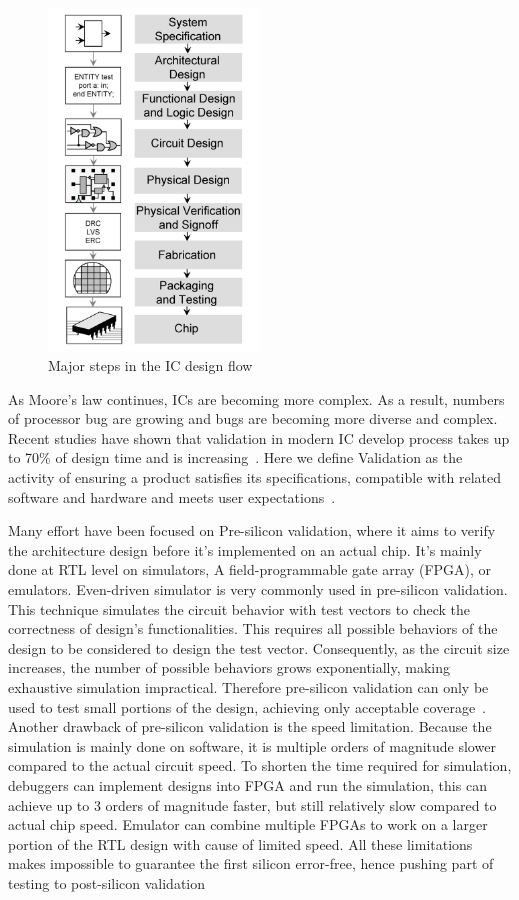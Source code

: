 \documentclass[12pt,frontmatter,copyright,thesis]{usfmanus}
\begin{document}
\begin{figure}[h]
\centering
\includegraphics[width=0.5\textwidth]{integrated_circuit_design.png}
\caption{Major steps in the IC design flow~\cite{white2004process}}
\label{ICdesign}
\end{figure}

As Moore's law continues, ICs are becoming more complex.
As a result, numbers of processor bug are 
growing and bugs are becoming more diverse and complex.
Recent studies have shown that validation in modern IC
develop process takes up to 70$\%$
of design time and is increasing~\cite{foster2013design}.
Here we define Validation as the activity of ensuring a product satisfies its specifications, 
compatible with related software and hardware and meets user expectations~\cite{validationWall}.

Many effort have been focused on Pre-silicon validation,
where it aims to verify the architecture design before 
it's implemented on an actual chip. 
It's mainly done at RTL level on simulators, A field-programmable gate array (FPGA), or emulators. 
Even-driven simulator is very commonly used in pre-silicon validation.
This technique simulates the circuit behavior with test vectors to
check the correctness of design's functionalities. This requires
all possible behaviors of the design to be considered to design
the test vector. Consequently, as the circuit size increases, 
the number of possible behaviors grows exponentially, making
exhaustive simulation impractical. Therefore pre-silicon validation
can only be used to test small portions of the design, achieving
only acceptable coverage~\cite{liu2014trace}.
Another drawback of pre-silicon validation is the speed limitation. Because
the simulation is mainly done on software, it is multiple orders
of magnitude slower compared to the actual circuit speed.
To shorten the time required for simulation, 
debuggers can implement designs into FPGA and
run the simulation, this can achieve up to 3 orders of magnitude faster, but still relatively slow compared to actual 
chip speed. 
Emulator can combine multiple FPGAs
to work on a larger portion of the RTL design with cause of limited speed. 
All these limitations makes
impossible to guarantee the first silicon error-free, hence
pushing part of testing to post-silicon validation 
\end{document}
